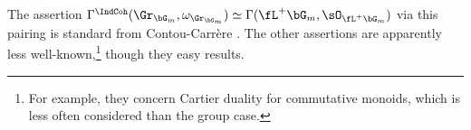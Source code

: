 \begin{rem}
\notready

The assertion $\Gamma^{\IndCoh}(\Gr_{\bG_m},\omega_{\Gr_{\bG_m}})
\simeq \Gamma(\fL^+ \bG_m,\sO_{\fL^+ \bG_m})$ via this
pairing is standard from Contou-Carr\`ere \cite{cc}.
The other assertions
are apparently less well-known,\footnote{For example,
they concern Cartier duality for commutative monoids,
which is less often considered than the group case.}
though they easy results.

\end{rem}

%

